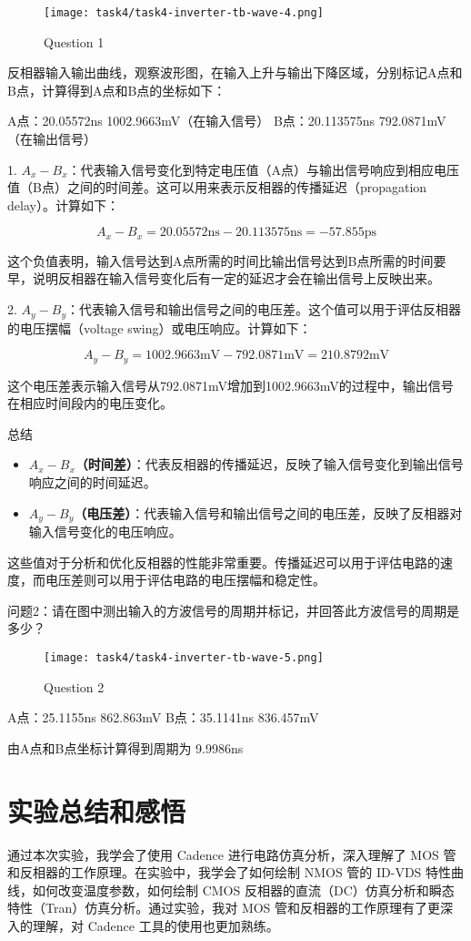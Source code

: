 \documentclass{theme-2614084}
\begin{document}
\begin{figure}[H]
  \centering
  \texttt{[image: task4/task4-inverter-tb-wave-4.png]}
  \caption{Question 1}
\end{figure}

反相器输入输出曲线，观察波形图，在输入上升与输出下降区域，分别标记A点和B点，计算得到A点和B点的坐标如下：

A点：20.05572ns 1002.9663mV（在输入信号）
B点：20.113575ns 792.0871mV（在输出信号）

1. $A_x - B_x$：代表输入信号变化到特定电压值（A点）与输出信号响应到相应电压值（B点）之间的时间差。这可以用来表示反相器的传播延迟（propagation delay）。计算如下：

   \[
   A_x - B_x = 20.05572\text{ns} - 20.113575\text{ns} = -57.855\text{ps}
   \]

   这个负值表明，输入信号达到A点所需的时间比输出信号达到B点所需的时间要早，说明反相器在输入信号变化后有一定的延迟才会在输出信号上反映出来。

2. $A_y - B_y$：代表输入信号和输出信号之间的电压差。这个值可以用于评估反相器的电压摆幅（voltage swing）或电压响应。计算如下：

   \[
   A_y - B_y = 1002.9663\text{mV} - 792.0871\text{mV} = 210.8792\text{mV}
   \]

   这个电压差表示输入信号从792.0871mV增加到1002.9663mV的过程中，输出信号在相应时间段内的电压变化。

总结

\begin{itemize}
  \item \textbf{$A_x - B_x$（时间差）}：代表反相器的传播延迟，反映了输入信号变化到输出信号响应之间的时间延迟。
  \item \textbf{$A_y - B_y$（电压差）}：代表输入信号和输出信号之间的电压差，反映了反相器对输入信号变化的电压响应。
\end{itemize}

这些值对于分析和优化反相器的性能非常重要。传播延迟可以用于评估电路的速度，而电压差则可以用于评估电路的电压摆幅和稳定性。

问题2：请在图中测出输入的方波信号的周期并标记，并回答此方波信号的周期是多少？

\begin{figure}[H]
  \centering
  \texttt{[image: task4/task4-inverter-tb-wave-5.png]}
  \caption{Question 2}
\end{figure}

A点：25.1155ns 862.863mV
B点：35.1141ns 836.457mV

由A点和B点坐标计算得到周期为 9.9986ns

\section{实验总结和感悟}

通过本次实验，我学会了使用 Cadence 进行电路仿真分析，深入理解了 MOS 管和反相器的工作原理。在实验中，我学会了如何绘制 NMOS 管的 ID-VDS 特性曲线，如何改变温度参数，如何绘制 CMOS 反相器的直流（DC）仿真分析和瞬态特性（Tran）仿真分析。通过实验，我对 MOS 管和反相器的工作原理有了更深入的理解，对 Cadence 工具的使用也更加熟练。
\end{document}
